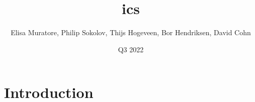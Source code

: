 \documentclass{article}
\title{ics}
\author{Elisa Muratore, Philip Sokolov, Thijs Hogeveen, Bor Hendriksen, David Cohn}
\date{Q3 2022}
\begin{document}
\maketitle

\section{Introduction}
\end{document}
